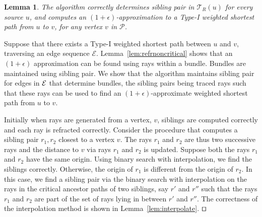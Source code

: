 \documentclass[11pt]{article}
\def\qed{\hbox{\rlap{$\sqcap$}$\sqcup$}}
\def\calT{\mathcal{T}}
\def\calE{\mathcal{E}}
\newtheorem{lemma}{Lemma}[section]
\newenvironment{proof}{\par\noindent{\bf Proof:}}{\mbox{}\hfill$\qed$\\}
\begin{document}
\begin{lemma}
\label{lem:type1find}
The algorithm correctly determines sibling pair in $\calT_R (u)$ for every source $u$, and computes an $(1+\epsilon)$-approximation to a Type-I weighted shortest path from $u$ to $v$, for any vertex $v$ in $\mathcal{P}$.
\end{lemma}
\begin{proof}
Suppose that there exists a Type-I weighted shortest path between $u$ and $v$, traversing an edge sequence ${\calE}$.
Lemma~\ref{lem:refrnoncritical} shows that an $(1+\epsilon)$ approximation can be found using rays within
a bundle. Bundles are maintained using sibling pair.
We show that the algorithm maintains sibling pair for edges in ${\cal E}$ that determine bundles, the sibling pairs being traced rays such that these rays can be used to find an $(1+\epsilon)$-approximate weighted shortest path from $u$ to $v$.

Initially when rays are generated from a vertex, $v$, siblings are computed correctly and each ray is refracted correctly.
Consider the procedure that computes a sibling pair $r_1, r_2$ closest to a vertex $v$.
The rays $r_1$ and $r_2$ are thus two successive rays and the distance to $v$ via rays $r_1$ and $r_2$ is updated.
Suppose both the rays $r_1$ and $r_2$ have the same origin.
Using binary search with interpolation, we find the siblings correctly.
Otherwise, the origin of $r_1$ is different from the origin of $r_2$.
In this case, we find a sibling pair via the binary search with interpolation on the rays in the critical ancestor paths of two siblings, say $r'$ and $r''$ such that the rays $r_1$ and $r_2$  are part of the set of rays lying in between $r'$ and $r''$.
The correctness of the interpolation method is shown in Lemma~\ref{lem:interpolate}.
\end{proof}
\end{document}
